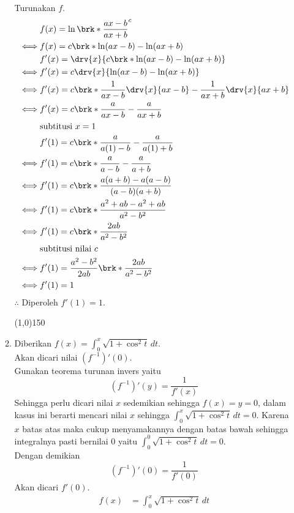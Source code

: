 \begin{enumerate}[leftmargin=*, label={\arabic*}.]
\begin{enumerate}[label={\alph*}.]
    Turunakan $f$.
    \begin{align*}
        &f(x) = \ln\brk*{\frac{ax-b}{ax+b}}^{c}\\
        \iff &f(x) = c\brk*{\ln(ax-b)-\ln(ax+b)}\\
        &f'(x) = \drv{x}{c\brk*{\ln(ax-b)-\ln(ax+b)}}\\
        \iff &f'(x) = c\drv{x}{\ln(ax-b)-\ln(ax+b)}\\
        \iff &f'(x) = c\brk*{\frac{1}{ax-b}\drv{x}{ax-b}
        -\frac{1}{ax+b}\drv{x}{ax+b}}\\
        \iff &f'(x) = c\brk*{\frac{a}{ax-b}
        -\frac{a}{ax+b}}\\
        &\text{subtitusi $x=1$}\\
        &f'(1) = c\brk*{\frac{a}{a(1)-b}-\frac{a}{a(1)+b}}\\
        \iff &f'(1) = c\brk*{\frac{a}{a-b}-\frac{a}{a+b}}\\
        \iff &f'(1) = c\brk*{\frac{a(a+b)-a(a-b)}{(a-b)(a+b)}}\\
        \iff &f'(1) = c\brk*{\frac{a^{2}+ab-a^{2}+ab}{a^{2}-b^{2}}}\\
        \iff &f'(1) = c\brk*{\frac{2ab}{a^{2}-b^{2}}}\\
        &\text{subtitusi nilai $c$}\\
        \iff &f'(1) = \frac{a^{2}-b^{2}}{2ab}\brk*{\frac{2ab}{a^{2}-b^{2}}}\\
        \iff &f'(1) = 1
    \end{align*}
    $\therefore$ Diperoleh $f'(1)=1$.
\begin{center}
    \line(1,0){150}
\end{center}
    \item Diberikan $f(x)=\int_0^{x}\sqrt{1+\cos^{2}t}\,dt$.\\
    Akan dicari nilai $(f^{-1})'(0)$.\\
    Gunakan teorema turunan invers yaitu
    \[
    (f^{-1})'(y) = \frac{1}{f'(x)}
    \]
    Sehingga perlu dicari nilai $x$ sedemikian sehingga $f(x)=y=0$, dalam kasus 
    ini berarti mencari nilai $x$ sehingga $\int_0^{x}\sqrt{1+\cos^{2}t}\,dt = 0$. 
    Karena $x$ batas atas maka cukup menyamakannya dengan batas bawah sehingga 
    integralnya pasti bernilai $0$ yaitu $\int_0^{0}\sqrt{1+\cos^{2}t}\,dt = 0$.\\
    Dengan demikian
    \[
    (f^{-1})'(0) = \frac{1}{f'(0)}
    \]
    Akan dicari $f'(0)$.
    \begin{align*}
        f(x)&=\int_0^{x}\sqrt{1+\cos^{2}t}\,dt\\

\end{align*}
\end{enumerate}
\end{enumerate}
